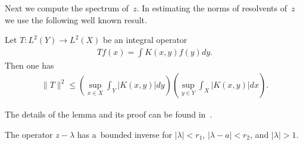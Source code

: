 Next we compute the spectrum of~$z$.
In estimating the norms of resolvents of~$z$ we use the following well known result.

\begin{Lemma}
\label{schuryounginq}
Let $T: L^2(Y) \longrightarrow L^2(X)$ be an integral operator
\begin{gather*}
Tf(x)=\int K(x,y)f(y)dy.
\end{gather*}
Then one has
\begin{gather*}
\|T\|^2 \le \left(\sup_{x\in X} \int_Y |K(x,y)|dy\right)\left(\sup_{y\in Y} \int_X |K(x,y)|dx\right).
\end{gather*}
\end{Lemma}

The details of the lemma and its proof can be found in~\cite{HS}.

\begin{Lemma}
\label{resolvent_of_z}
The operator $z-\lambda$ has a~bounded inverse for $|\lambda|< r_1$, $|\lambda-a|< r_2$, and $|\lambda|>1$.
\end{Lemma}

